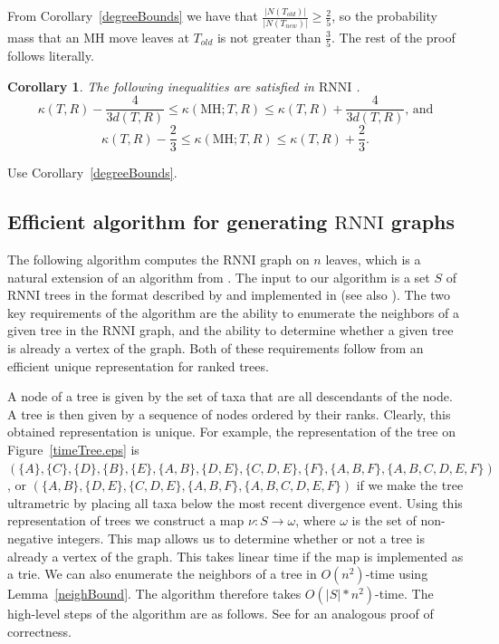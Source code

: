 \documentclass[11pt]{amsart}
\newtheorem{corollary}[lemma]{Corollary}
\theoremstyle{definition}
\newcommand{\rnni}{\mathrm{RNNI}}
\newcommand{\MH}{\mathrm{MH}}
\begin{document}
{\proof
From Corollary~\ref{degreeBounds} we have that $\frac{|N(T_{old})|}{|N(T_{new})|} \geq \frac{2}{5}$, so the probability mass that an MH move leaves at $T_{old}$ is not greater than $\frac35$.
The rest of the proof follows \autocite[][Proof of Lemma~V.8]{Whidden2015-es} literally.
\endproof

\begin{corollary}
The following inequalities are satisfied in $\rnni$ .
\[
\kappa(T,R) - \dfrac{4}{3d(T,R)} \leq \kappa(\MH;T,R) \leq \kappa(T,R) +
\dfrac{4}{3d(T,R)}\mbox{, and}
\]
\[
\kappa(T,R) - \dfrac23 \leq \kappa(\MH;T,R) \leq \kappa(T,R) + \dfrac23.
\]
\end{corollary}

\proof
Use Corollary~\ref{degreeBounds}.
\endproof
}{}


\subsection{Efficient algorithm for generating $\rnni$ graphs}

The following algorithm computes the $\rnni$ graph on $n$ leaves, which is a natural extension of an algorithm from \textcite{Whidden2015-es}.
The input to our algorithm is a set $S$ of $\rnni$ trees in the format described by \textcite{Gavryushkin2014-bw} and implemented in \autocite{tauGeodesic} (see also \autocite{Semple2003-nj}).
The two key requirements of the algorithm are the ability to enumerate the neighbors of a given tree in the $\rnni$ graph, and the ability to determine whether a given tree is already a vertex of the graph.
Both of these requirements follow from an efficient unique representation for ranked trees.

A node of a tree is given by the set of taxa that are all descendants of the node.
A tree is then given by a sequence of nodes ordered by their ranks.
Clearly, this obtained representation is unique.
For example, the representation of the tree on Figure~\ref{timeTree.eps} is $(\{A\}, \{C\}, \{D\}, \{B\}, \{E\}, \{A,B\}, \{D,E\}, \{C, D, E\}, \{F\}, \{A,B,F\}, \{A,B,C,D,E,F\})$, or
$(\{A,B\}, \{D,E\}, \{C, D, E\}, \{A,B,F\}, \{A,B,C,D,E,F\})$ if we make the tree ultrametric by placing all taxa below the most recent divergence event.
Using this representation of trees we construct a map $\nu : S \to \omega$, where $\omega$ is the set of non-negative integers.
This map allows us to determine whether or not a tree is already a vertex of the graph.
This takes linear time if the map is implemented as a trie.
We can also enumerate the neighbors of a tree in $O(n^2)$-time using Lemma~\ref{neighBound}.
The algorithm therefore takes $O(|S|*n^2)$-time.
The high-level steps of the algorithm are as follows.
See \cite{Whidden2015-es} for an analogous proof of correctness.
\end{document}

